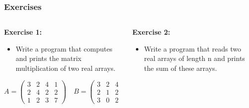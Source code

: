 \documentclass[10pt]{beamer}
\begin{document}
\begin{frame}[fragile]
  \frametitle{Exercises}
  \begin{columns}[t]
    \begin{column}{0.5\textwidth}
      \textbf{Exercise 1:}
      \begin{itemize}
        \item Write a program that computes and prints the matrix multiplication of two real arrays.
      \end{itemize}
      \vspace*{0.2cm}
      \[
      A = \begin{pmatrix}
      3 & 2 & 4 & 1 \\
      2 & 4 & 2 & 2 \\
      1 & 2 & 3 & 7
      \end{pmatrix}
      \quad
      B = \begin{pmatrix}
      3 & 2 & 4 \\
      2 & 1 & 2 \\
      3 & 0 & 2
      \end{pmatrix}
      \]
    \end{column}

    \begin{column}{0.5\textwidth}
      \textbf{Exercise 2:}
      \begin{itemize}
        \item Write a program that reads two real arrays of length n and prints the sum of these arrays.
      \end{itemize}
    \end{column}
  \end{columns}
\end{frame}
\end{document}
